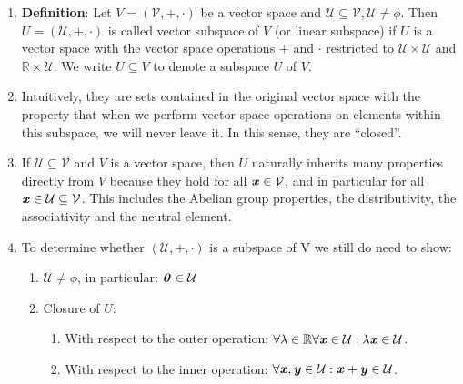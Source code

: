 \begin{enumerate}
    \item \textbf{Definition}: Let $V = (\mathcal{V}, +, \cdot )$ be a vector space and $\mathcal{U} \subseteq \mathcal{V}, \mathcal{U} \neq \phi$. 
    Then $U = (\mathcal{U}, +, \cdot )$ is called vector subspace of $V$ (or linear subspace) if $U$ is a vector space with the vector space operations $+$ and $\cdot$  restricted to $\mathcal{U} \times \mathcal{U}$ and $\mathbb{R} \times \mathcal{U}$. 
    We write $U \subseteq V$ to denote a subspace $U$ of $V$.
    \hfill \cite{mfml/book/mml/Deisenroth-Faisal-Ong}

    \item Intuitively, they are sets contained in the original vector space with the property that when we perform vector space operations on elements within this subspace, we will never leave it. 
    In this sense, they are “closed”.
    \hfill \cite{mfml/book/mml/Deisenroth-Faisal-Ong}

    \item If $\mathcal{U} \subseteq \mathcal{V}$ and $V$ is a vector space, then $U$ naturally inherits many properties directly from $V$ because they hold for all $\text{\textbf{\textit{x}}} \in \mathcal{V}$, and in particular for all $\text{\textbf{\textit{x}}} \in \mathcal{U} \subseteq \mathcal{V}$. 
    This includes the Abelian group properties, the distributivity, the associativity and the neutral element.
    \hfill \cite{mfml/book/mml/Deisenroth-Faisal-Ong}

    \item To determine whether $(\mathcal{U}, +, \cdot)$ is a subspace of V we still do need to show:
    \begin{enumerate}
        \item $\mathcal{U} \neq \phi$, in particular: $\text{\textbf{\textit{0}}} \in \mathcal{U}$
        \hfill \cite{mfml/book/mml/Deisenroth-Faisal-Ong}

        \item Closure of $U$:
        \begin{enumerate}
            \item With respect to the outer operation: $\forall \lambda  \in  \mathbb{R} \forall \text{\textbf{\textit{x}}} \in  \mathcal{U} : \lambda \text{\textbf{\textit{x}}} \in  \mathcal{U}$.
            \hfill \cite{mfml/book/mml/Deisenroth-Faisal-Ong}
            
            \item With respect to the inner operation: $\forall \text{\textbf{\textit{x}}}, \text{\textbf{\textit{y}}} \in  \mathcal{U} : \text{\textbf{\textit{x}}} + \text{\textbf{\textit{y}}} \in  \mathcal{U}$.
            \hfill \cite{mfml/book/mml/Deisenroth-Faisal-Ong}
        \end{enumerate}
    \end{enumerate}

\end{enumerate}


